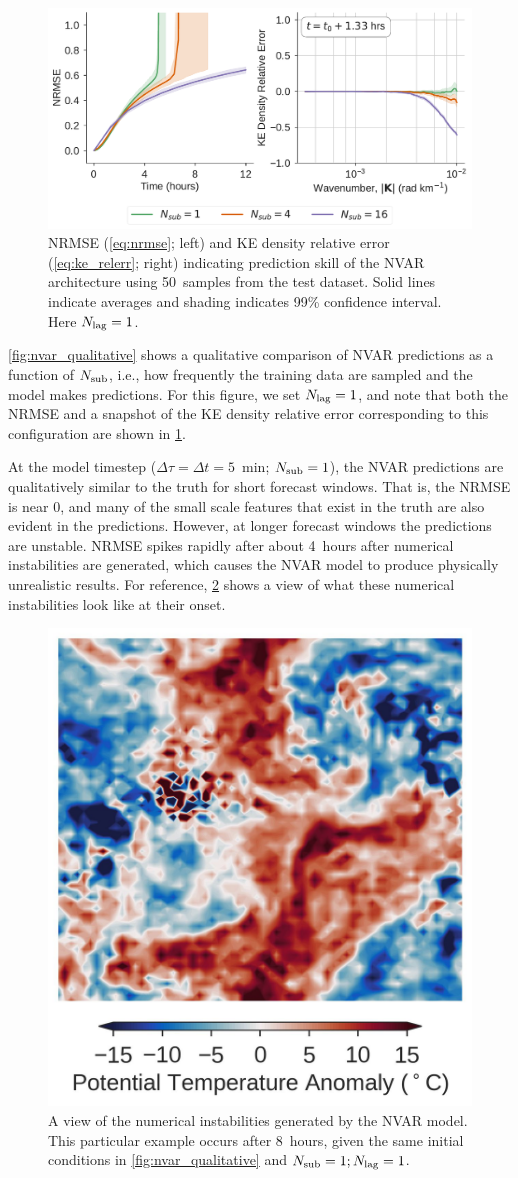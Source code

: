 \begin{figure}
    \centering
    \includegraphics[width=.8\textwidth]{../figures/nvar-nrmse-and-kere.pdf}
    \caption{NRMSE (\cref{eq:nrmse}; left) and KE density
        relative error (\cref{eq:ke_relerr}; right)
        indicating prediction skill of the NVAR
        architecture using 50~samples from the test dataset.
        Solid lines indicate averages and shading indicates 99\% confidence
        interval.
        Here $N_\text{lag}=1$.
    }
    \label{fig:nvar_nrmse}
\end{figure}

\cref{fig:nvar_qualitative} shows a qualitative comparison of NVAR predictions
as a function of $N_\text{sub}$, i.e., how frequently the training data are sampled and
the model makes predictions.
For this figure, we set $N_\text{lag}=1$, and note that both the NRMSE and a snapshot
of the KE density relative error corresponding to this configuration are shown in
\cref{fig:nvar_nrmse}.

At the model timestep ($\Delta \tau = \Delta t = 5$~min; $N_\text{sub}=1$), the NVAR predictions are
qualitatively similar to the truth for short forecast windows.
That is, the NRMSE is near 0, and
many of the small scale features that exist in the truth are also evident
in the predictions.
However, at longer forecast windows the predictions are unstable.
NRMSE spikes rapidly after about 4~hours after numerical instabilities are
generated, which causes the NVAR model to produce physically unrealistic results.
For reference, \cref{fig:nvar_instabilities} shows a view of what these
numerical instabilities look like at their onset.

\begin{figure}
    \centering
    \includegraphics[width=.3\textwidth]{../figures/nvar_instabilities.jpg}
    \caption{A view of the numerical instabilities generated by the NVAR model.
        This particular example occurs after 8~hours, given the same initial
        conditions in \cref{fig:nvar_qualitative} and $N_\text{sub}=1; N_\text{lag}=1$.
    }

    \label{fig:nvar_instabilities}
\end{figure}

